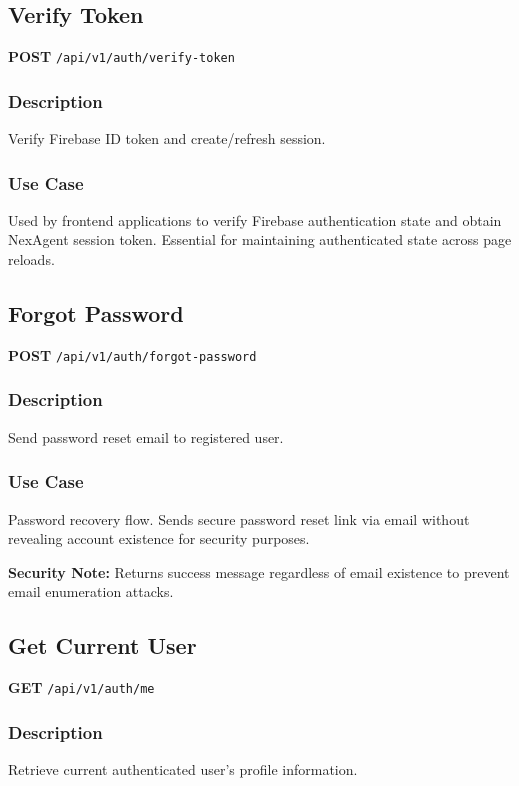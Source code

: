 \documentclass[11pt,a4paper]{report}
\begin{document}
\subsection{Verify Token}

\textbf{POST} \texttt{/api/v1/auth/verify-token}

\subsubsection{Description}
Verify Firebase ID token and create/refresh session.

\subsubsection{Use Case}
Used by frontend applications to verify Firebase authentication state and obtain NexAgent session token. Essential for maintaining authenticated state across page reloads.

\subsection{Forgot Password}

\textbf{POST} \texttt{/api/v1/auth/forgot-password}

\subsubsection{Description}
Send password reset email to registered user.

\subsubsection{Use Case}
Password recovery flow. Sends secure password reset link via email without revealing account existence for security purposes.

\begin{infobox}
\textbf{Security Note:}
Returns success message regardless of email existence to prevent email enumeration attacks.
\end{infobox}

\subsection{Get Current User}

\textbf{GET} \texttt{/api/v1/auth/me}

\subsubsection{Description}
Retrieve current authenticated user's profile information.
\end{document}
